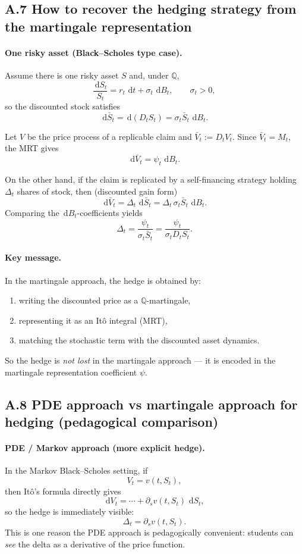 \documentclass[11pt]{article}
\newcommand{\Qbb}{\mathbb{Q}}
\newcommand{\dd}{\,\mathrm{d}}
\newcommand{\1}{\mathbf{1}}
\begin{document}
\subsection*{A.7 How to recover the hedging strategy from the martingale representation}

\paragraph{One risky asset (Black--Scholes type case).}
Assume there is one risky asset \(S\) and, under \(\Qbb\),
$$
\frac{\dd S_t}{S_t}=r_t\,\dd t+\sigma_t\,\dd B_t,
\qquad \sigma_t>0,
$$
so the discounted stock satisfies
$$
\dd \bar S_t = \dd(D_tS_t)=\sigma_t \bar S_t\,\dd B_t.
$$

Let \(V\) be the price process of a replicable claim and \(\bar V_t:=D_tV_t\).
Since \(\bar V_t=M_t\), the MRT gives
$$
\dd \bar V_t=\psi_t\,\dd B_t.
$$

On the other hand, if the claim is replicated by a self-financing strategy holding \(\Delta_t\) shares of stock, then (discounted gain form)
$$
\dd \bar V_t=\Delta_t\,\dd \bar S_t
=\Delta_t\,\sigma_t \bar S_t\,\dd B_t.
$$
Comparing the \(\dd B_t\)-coefficients yields
$$
\boxed{\ \Delta_t=\frac{\psi_t}{\sigma_t \bar S_t}
=\frac{\psi_t}{\sigma_t D_t S_t}. \ }
$$

\paragraph{Key message.}
In the martingale approach, the hedge is obtained by:
\begin{enumerate}[leftmargin=1.6em]
    \item writing the discounted price as a \(\Qbb\)-martingale,
    \item representing it as an It\^o integral (MRT),
    \item matching the stochastic term with the discounted asset dynamics.
\end{enumerate}

So the hedge is \emph{not lost} in the martingale approach --- it is encoded in the martingale representation coefficient \(\psi\).


\subsection*{A.8 PDE approach vs martingale approach for hedging (pedagogical comparison)}

\paragraph{PDE / Markov approach (more explicit hedge).}
In the Markov Black--Scholes setting, if
$$
V_t=v(t,S_t),
$$
then It\^o's formula directly gives
$$
\dd V_t = \cdots + \partial_s v(t,S_t)\,\dd S_t,
$$
so the hedge is immediately visible:
$$
\boxed{\ \Delta_t=\partial_s v(t,S_t). \ }
$$
This is one reason the PDE approach is pedagogically convenient: students can \emph{see} the delta as a derivative of the price function.
\end{document}
